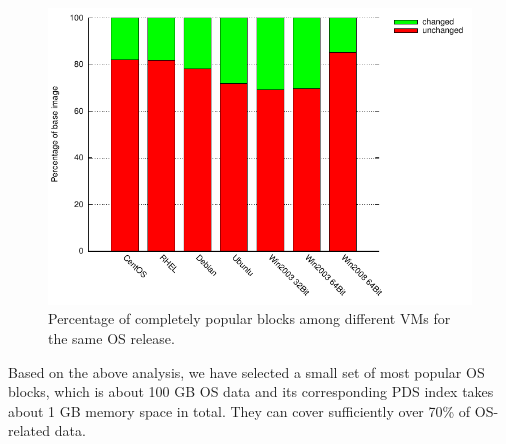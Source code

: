 
\begin{figure}
\centering
\includegraphics[width=5in]{images/os_subset.pdf}
\caption{Percentage of completely popular blocks among different VMs for the same OS release.}
\label{fig:OSunchanged}
\end{figure}

Based on the above analysis, we have selected a small set of most popular
OS blocks, which is about 100 GB OS data and its corresponding PDS index takes about 1 GB memory space in total.
They can cover sufficiently over 70\% of OS-related data.






